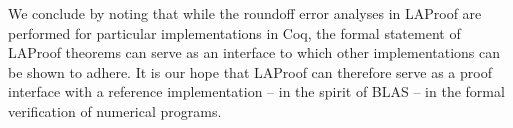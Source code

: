 We conclude by noting that while the roundoff error analyses in LAProof are
performed for particular implementations in Coq, the formal statement of LAProof
theorems can serve as an interface to which other implementations can be shown
to adhere. It is our hope that LAProof can therefore serve as a proof interface
with a reference implementation -- in the spirit of BLAS -- in the formal
verification of numerical programs.

